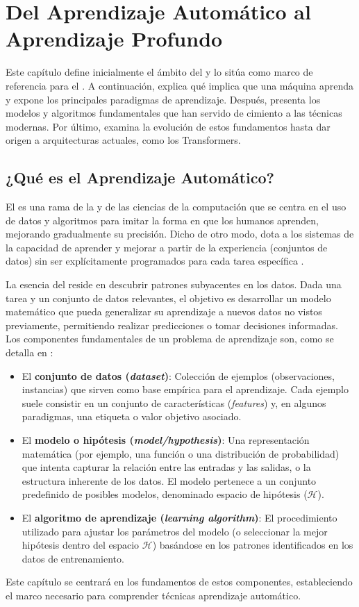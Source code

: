 \chapter{Del Aprendizaje Automático al Aprendizaje Profundo}
\label{chap:FundamentosMLDL}
\glsresetall

Este capítulo define inicialmente el ámbito del  y lo sitúa como marco de referencia para el . A continuación, explica qué implica que una máquina aprenda y expone los principales paradigmas de aprendizaje. Después, presenta los modelos y algoritmos fundamentales que han servido de cimiento a las técnicas modernas. Por último, examina la evolución de estos fundamentos hasta dar origen a arquitecturas actuales, como los Transformers.

\section{¿Qué es el Aprendizaje Automático?}
\label{sec:QueEsML}
El  es una rama de la  y de las ciencias de la computación que se centra en el uso de datos y algoritmos para imitar la forma en que los humanos aprenden, mejorando gradualmente su precisión. Dicho de otro modo, dota a los sistemas de la capacidad de aprender y mejorar a partir de la experiencia (conjuntos de datos) sin ser explícitamente programados para cada tarea específica \citep{Goodfellow2016}.

La esencia del  reside en descubrir patrones subyacentes en los datos. Dada una tarea y un conjunto de datos relevantes, el objetivo es desarrollar un modelo matemático que pueda generalizar su aprendizaje a nuevos datos no vistos previamente, permitiendo realizar predicciones o tomar decisiones informadas. Los componentes fundamentales de un problema de aprendizaje son, como se detalla en \citet{abu-mostafa_learning_2012}:
\begin{itemize}
    \item El \textbf{conjunto de datos (\textit{dataset})}: Colección de ejemplos (observaciones, instancias) que sirven como base empírica para el aprendizaje. Cada ejemplo suele consistir en un conjunto de características (\textit{features}) y, en algunos paradigmas, una etiqueta o valor objetivo asociado.
    \item El \textbf{modelo o hipótesis (\textit{model/hypothesis})}: Una representación matemática (por ejemplo, una función o una distribución de probabilidad) que intenta capturar la relación entre las entradas y las salidas, o la estructura inherente de los datos. El modelo pertenece a un conjunto predefinido de posibles modelos, denominado espacio de hipótesis ($\mathcal{H}$).
    \item El \textbf{algoritmo de aprendizaje (\textit{learning algorithm})}: El procedimiento utilizado para ajustar los parámetros del modelo (o seleccionar la mejor hipótesis dentro del espacio $\mathcal{H}$) basándose en los patrones identificados en los datos de entrenamiento.
\end{itemize}
Este capítulo se centrará en los fundamentos de estos componentes, estableciendo el marco necesario para comprender técnicas aprendizaje automático.

